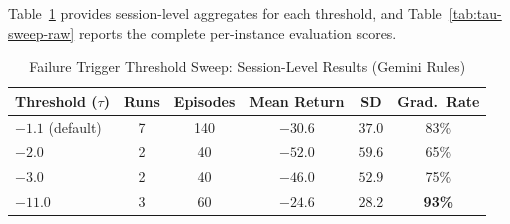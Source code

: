 \documentclass[sigconf]{acmart}
\begin{document}
Table~\ref{tab:tau-sweep-summary} provides session-level aggregates for each threshold, and Table~\ref{tab:tau-sweep-raw} reports the complete per-instance evaluation scores.

\begin{table}[htbp]
\centering
\scriptsize
\caption{Failure Trigger Threshold Sweep: Session-Level Results (Gemini Rules)}
\label{tab:tau-sweep-summary}
\begin{tabular}{lccccc}
\toprule
\textbf{Threshold ($\tau$)} & \textbf{Runs} & \textbf{Episodes} & \textbf{Mean Return} & \textbf{SD} & \textbf{Grad.\ Rate} \\
\midrule
$-1.1$ (default) & 7 & 140 & $-30.6$ & $37.0$ & 83\% \\
$-2.0$           & 2 & 40  & $-52.0$ & $59.6$ & 65\% \\
$-3.0$           & 2 & 40  & $-46.0$ & $52.9$ & 75\% \\
$-11.0$          & 3 & 60  & $\mathbf{-24.6}$ & $28.2$ & \textbf{93\%} \\
\bottomrule
\end{tabular}
\end{table}
\end{document}
